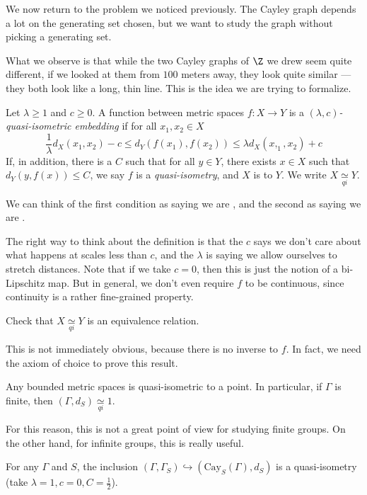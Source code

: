 \documentclass[a4paper]{article}
\newcommand\Cay{\mathrm{Cay}}
\newcommand{\qi}{\underset{qi}{\simeq}}
\begin{document}
We now return to the problem we noticed previously. The Cayley graph depends a lot on the generating set chosen, but we want to study the graph without picking a generating set.

What we observe is that while the two Cayley graphs of $\Z$ we drew seem quite different, if we looked at them from $100$ meters away, they look quite similar --- they both look like a long, thin line. This is the idea we are trying to formalize.

\begin{defi}
  Let $\lambda \geq 1$ and $c \geq 0$. A function between metric spaces $f: X \to Y$ is a \emph{$(\lambda, c)$-quasi-isometric embedding} if for all $x_1, x_2 \in X$
  \[
    \frac{1}{\lambda} d_X(x_1, x_2) - c \leq d_Y(f(x_1), f(x_2)) \leq \lambda d_X(x,_1, x_2) + c
  \]
  If, in addition, there is a $C$ such that for all $y \in Y$, there exists $x \in X$ such that $d_Y(y, f(x)) \leq C$, we say $f$ is a \emph{quasi-isometry}, and $X$ is  to $Y$. We write $X\qi Y$.
\end{defi}
We can think of the first condition as saying we are , and the second as saying we are .

The right way to think about the definition is that the $c$ says we don't care about what happens at scales less than $c$, and the $\lambda$ is saying we allow ourselves to stretch distances. Note that if we take $c = 0$, then this is just the notion of a bi-Lipschitz map. But in general, we don't even require $f$ to be continuous, since continuity is a rather fine-grained property.

\begin{ex}
  Check that $ X\qi Y$ is an equivalence relation.
\end{ex}
This is not immediately obvious, because there is no inverse to $f$. In fact, we need the axiom of choice to prove this result.

\begin{eg}
  Any bounded metric spaces is quasi-isometric to a point. In particular, if $\Gamma$ is finite, then $(\Gamma, d_S) \qi 1$.
\end{eg}
For this reason, this is not a great point of view for studying finite groups. On the other hand, for infinite groups, this is really useful.

\begin{eg}
  For any $\Gamma$ and $S$, the inclusion $(\Gamma, \Gamma_S)\hookrightarrow (\Cay_S(\Gamma), d_S)$ is a quasi-isometry (take $\lambda = 1, c = 0, C = \frac{1}{2}$).
\end{eg}
\end{document}
